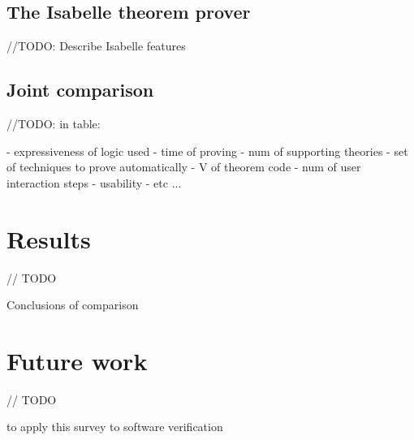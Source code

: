 \documentclass[article]{aaltoseries}
\begin{document}
\subsection{The Isabelle theorem prover}
\label{sec:prover_isabelle}

//TODO: Describe Isabelle features


\subsection{Joint comparison}
\label{sec:prover_isabelle}

//TODO: in table:

- expressiveness of logic used
- time of proving
- num of supporting theories
- set of techniques to prove automatically
- V of theorem code
- num of user interaction steps
- usability
- etc ...



\section{Results}
\label{sec:results}
// TODO

Conclusions of comparison


\section{Future work}
\label{sec:future_work}
// TODO

to apply this survey to software verification






\end{document}
